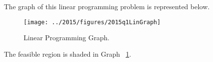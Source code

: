 \begin{subquestions}
\begin{subsubquestions}
\begin{subsubsubquestions}
\end{subsubsubquestions}


\subsubquestion

\begin{subsubsubquestions}

	
\subsubsubquestion

The graph of this linear programming problem is represented below.

\begin{figure}
	\begin{center}
		\texttt{[image: ../2015/figures/2015q1LinGraph]}
		\caption{\label{2015:q1:graph:Graph1} Linear Programming Graph.}
	\end{center}
\end{figure}


\subsubsubquestion

The feasible region is shaded in Graph ~\ref{2015:q1:graph:Graph1}.

\end{subsubsubquestions}


\subsubquestion

\begin{subsubsubquestions}
	


\end{subsubsubquestions}
\end{subsubquestions}
\end{subquestions}
